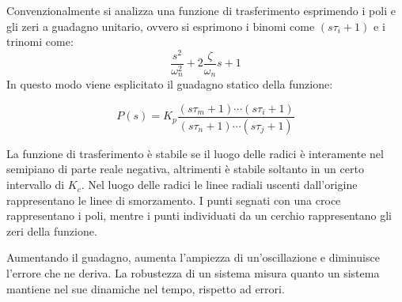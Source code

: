 \documentclass{article}
\numberwithin{equation}{subsection}
\begin{document}
Convenzionalmente si analizza una funzione di trasferimento esprimendo i poli e gli zeri a guadagno unitario, ovvero si esprimono i binomi come $(s\tau_i+1)$ e i trinomi 
come:
\begin{equation*}
    \displaystyle\frac{s^2}{\omega_n^2}+2\frac{\zeta}{\omega_n}s+1
\end{equation*}
In questo modo viene esplicitato il guadagno statico della funzione:

\begin{equation}
    P(s)=K_p\displaystyle\frac{(s\tau_m+1)\cdots(s\tau_i+1)}{(s\tau_n+1)\cdots(s\tau_j+1)}
\end{equation}

La funzione di trasferimento è stabile se il luogo delle radici è interamente nel semipiano di parte reale negativa, altrimenti è stabile soltanto 
in un certo intervallo di $K_c$. Nel luogo delle radici le linee radiali uscenti dall'origine rappresentano le linee di smorzamento. 
I punti segnati con una croce rappresentano i poli, mentre i punti individuati da un cerchio rappresentano gli zeri della funzione.

Aumentando il guadagno, aumenta l'ampiezza di un'oscillazione e diminuisce l'errore che ne deriva. La robustezza di un sistema misura quanto un sistema mantiene nel sue 
dinamiche nel tempo, rispetto ad errori. 
\end{document}
